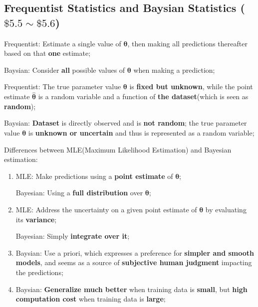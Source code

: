 \documentclass[12pt]{article}
\numberwithin{equation}{section}
\begin{document}
\subsection{Frequentist Statistics and Baysian Statistics ($\$5.5 \sim \$5.6$)}
Frequentist: Estimate a single value of $\boldsymbol\theta$, then making all predictions thereafter based on that \textbf{one} estimate; \par
Baysian: Consider \textbf{all} possible values of $\boldsymbol\theta$ when making a prediction; \par
Frequentist: The true parameter value $\boldsymbol\theta$ is \textbf{fixed but unknown}, while the point estimate $\hat{\boldsymbol\theta}$ is a random variable and a function of \textbf{the dataset}(which is seen as \textbf{random}); \par
Baysian: \textbf{Dataset} is directly observed and is \textbf{not random}; the true parameter value $\boldsymbol\theta$ is \textbf{unknown or uncertain} and thus is represented as a random variable; \par
Differences between MLE(Maximum Likelihood Estimation) and Bayesian estimation:
\begin{enumerate}
	\item MLE: Make predictions using a \textbf{point estimate} of $\boldsymbol\theta$; \par
	Bayesian: Using a \textbf{full distribution} over $\boldsymbol\theta$;
	\item MLE: Address the uncertainty on a given point estimate of $\boldsymbol\theta$ by evaluating its \textbf{variance}; \par
	Bayesian: Simply \textbf{integrate over it};
	\item Baysian: Use a priori, which expresses a preference for \textbf{simpler and smooth models}, and seems as a source of \textbf{subjective human judgment} impacting the predictions; \par
	\item Baysian: \textbf{Generalize much better} when training data is \textbf{small}, but \textbf{high computation cost} when training data is \textbf{large};
\end{enumerate}
\end{document}
